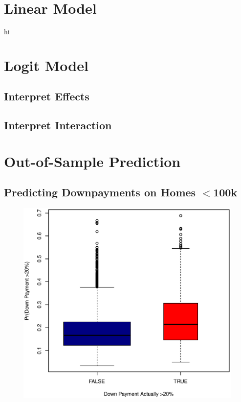 \documentclass[11pt, fleqn]{article}
\begin{document}
\section{Linear Model}


hi

\section{Logit Model}

\subsection{Interpret Effects}


\subsection{Interpret Interaction}


\section{Out-of-Sample Prediction}
\subsection{Predicting Downpayments on Homes $<$100k}
\begin{figure}[!htb]
  \centering
  \includegraphics[scale=.5]{oos_lt100k.eps}
  \caption{}
  \label{fig:oos_lt100k}
\end{figure}
\end{document}
